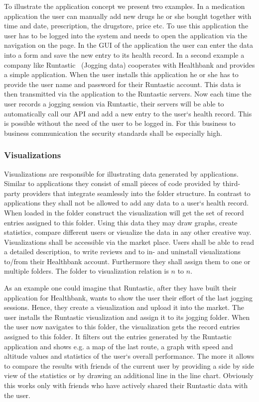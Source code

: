 To illustrate the application concept we present two examples. In a medication application the user can manually add new drugs he or she bought together with time and date, prescription, the drugstore, price etc. To use this 
application the user has to be logged into the system and needs to open the application via the navigation on the page. In the GUI of the application the user can enter the data into a form and save the new entry to its health record. \newline
In a second example a company like Runtastic~\cite{runtastic} (Jogging data) cooperates with Healthbank and provides a simple application. When the user installs this application he or she has to provide the user name and password for their Runtastic account. This data is then transmitted via the application to the Runtastic servers. Now each time the user records a jogging session via Runtastic, their servers will be able to automatically call our API and add a new entry to the user`s health record. This is possible without the need of the user to be logged in. For this business to business communication the security standards shall be especially high.


\subsubsection{Visualizations}

Visualizations are responsible for illustrating data generated by applications. Similar to applications they consist of small pieces of code provided by third-party providers that integrate seamlessly into the folder structure. In contrast to applications they shall not be allowed to add any data to a user`s health record. When loaded in the folder construct the visualization will get the set of record entries assigned to this folder. Using this data they may draw graphs, create statistics, compare different users or visualize the data in any other creative way. Visualizations shall be accessible via the market place. Users shall be able to read a detailed description, to write reviews and to in- and uninstall visualizations to/from their Healthbank account. Furthermore they shall assign them to one or multiple folders. The folder to visualization relation is $n$ to $n$.

As an example one could imagine that Runtastic, after they have built their application for Healthbank, wants to show the user their effort of the last jogging sessions. Hence, they create a visualization and upload it into the market. The user installs the Runtastic visualization and assign it to its jogging folder. When the user now navigates to this folder, the visualization gets the record entries assigned to this folder. It filters out the entries generated by the Runtastic application and shows e.g. a map of the last route, a graph with speed and altitude values and statistics of the user`s overall performance. The more it allows to compare the results with friends of the current user by providing a side by side view of the statistics or by drawing an additional line in the line chart. Obviously this works only with friends who have actively shared their Runtastic data with the user.


